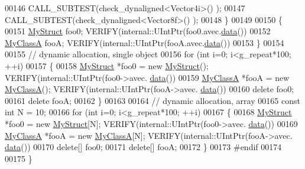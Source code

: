 \begin{DoxyCode}
00146     CALL\_SUBTEST(check\_dynaligned<Vector4i>() );
00147     CALL\_SUBTEST(check\_dynaligned<Vector8f>() );
00148   \}
00149 
00150   \{
00151     \hyperlink{struct_my_struct}{MyStruct} foo0;  VERIFY(internal::UIntPtr(foo0.avec.\hyperlink{class_eigen_1_1_plain_object_base_ac25699535374b1854cf8494e44ad31b2}{data}())%
00152     \hyperlink{class_my_class_a}{MyClassA} fooA;  VERIFY(internal::UIntPtr(fooA.avec.\hyperlink{class_eigen_1_1_plain_object_base_ac25699535374b1854cf8494e44ad31b2}{data}())%
00153   \}
00154   
00155   \textcolor{comment}{// dynamic allocation, single object}
00156   \textcolor{keywordflow}{for} (\textcolor{keywordtype}{int} i=0; i<g\_repeat*100; ++i)
00157   \{
00158     \hyperlink{struct_my_struct}{MyStruct} *foo0 = \textcolor{keyword}{new} \hyperlink{struct_my_struct}{MyStruct}();  VERIFY(internal::UIntPtr(foo0->avec.
      \hyperlink{class_eigen_1_1_plain_object_base_ac25699535374b1854cf8494e44ad31b2}{data}())%
00159     \hyperlink{class_my_class_a}{MyClassA} *fooA = \textcolor{keyword}{new} \hyperlink{class_my_class_a}{MyClassA}();  VERIFY(internal::UIntPtr(fooA->avec.
      \hyperlink{class_eigen_1_1_plain_object_base_ac25699535374b1854cf8494e44ad31b2}{data}())%
00160     \textcolor{keyword}{delete} foo0;
00161     \textcolor{keyword}{delete} fooA;
00162   \}
00163 
00164   \textcolor{comment}{// dynamic allocation, array}
00165   \textcolor{keyword}{const} \textcolor{keywordtype}{int} N = 10;
00166   \textcolor{keywordflow}{for} (\textcolor{keywordtype}{int} i=0; i<g\_repeat*100; ++i)
00167   \{
00168     \hyperlink{struct_my_struct}{MyStruct} *foo0 = \textcolor{keyword}{new} \hyperlink{struct_my_struct}{MyStruct}[N];  VERIFY(internal::UIntPtr(foo0->avec.
      \hyperlink{class_eigen_1_1_plain_object_base_ac25699535374b1854cf8494e44ad31b2}{data}())%
00169     \hyperlink{class_my_class_a}{MyClassA} *fooA = \textcolor{keyword}{new} \hyperlink{class_my_class_a}{MyClassA}[N];  VERIFY(internal::UIntPtr(fooA->avec.
      \hyperlink{class_eigen_1_1_plain_object_base_ac25699535374b1854cf8494e44ad31b2}{data}())%
00170     \textcolor{keyword}{delete}[] foo0;
00171     \textcolor{keyword}{delete}[] fooA;
00172   \}
00173 \textcolor{preprocessor}{  #endif}
00174   
00175 \}
\end{DoxyCode}
